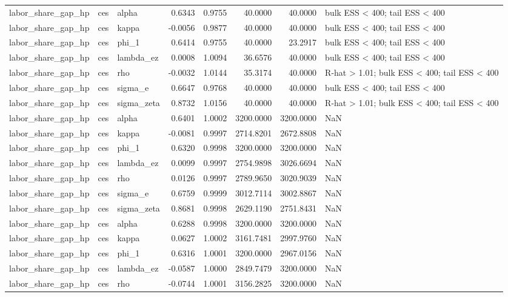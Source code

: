 \begin{tabular}{lllrrrrl}
labor\_share\_gap\_hp & ces & alpha & 0.6343 & 0.9755 & 40.0000 & 40.0000 & bulk ESS < 400; tail ESS < 400 \\
labor\_share\_gap\_hp & ces & kappa & -0.0056 & 0.9877 & 40.0000 & 40.0000 & bulk ESS < 400; tail ESS < 400 \\
labor\_share\_gap\_hp & ces & phi\_1 & 0.6414 & 0.9755 & 40.0000 & 23.2917 & bulk ESS < 400; tail ESS < 400 \\
labor\_share\_gap\_hp & ces & lambda\_ez & 0.0008 & 1.0094 & 36.6576 & 40.0000 & bulk ESS < 400; tail ESS < 400 \\
labor\_share\_gap\_hp & ces & rho & -0.0032 & 1.0144 & 35.3174 & 40.0000 & R-hat > 1.01; bulk ESS < 400; tail ESS < 400 \\
labor\_share\_gap\_hp & ces & sigma\_e & 0.6647 & 0.9768 & 40.0000 & 40.0000 & bulk ESS < 400; tail ESS < 400 \\
labor\_share\_gap\_hp & ces & sigma\_zeta & 0.8732 & 1.0156 & 40.0000 & 40.0000 & R-hat > 1.01; bulk ESS < 400; tail ESS < 400 \\
labor\_share\_gap\_hp & ces & alpha & 0.6401 & 1.0002 & 3200.0000 & 3200.0000 & NaN \\
labor\_share\_gap\_hp & ces & kappa & -0.0081 & 0.9997 & 2714.8201 & 2672.8808 & NaN \\
labor\_share\_gap\_hp & ces & phi\_1 & 0.6320 & 0.9998 & 3200.0000 & 3200.0000 & NaN \\
labor\_share\_gap\_hp & ces & lambda\_ez & 0.0099 & 0.9997 & 2754.9898 & 3026.6694 & NaN \\
labor\_share\_gap\_hp & ces & rho & 0.0126 & 0.9997 & 2789.9650 & 3020.9039 & NaN \\
labor\_share\_gap\_hp & ces & sigma\_e & 0.6759 & 0.9999 & 3012.7114 & 3002.8867 & NaN \\
labor\_share\_gap\_hp & ces & sigma\_zeta & 0.8681 & 0.9998 & 2629.1190 & 2751.8431 & NaN \\
labor\_share\_gap\_hp & ces & alpha & 0.6288 & 0.9998 & 3200.0000 & 3200.0000 & NaN \\
labor\_share\_gap\_hp & ces & kappa & 0.0627 & 1.0002 & 3161.7481 & 2997.9760 & NaN \\
labor\_share\_gap\_hp & ces & phi\_1 & 0.6316 & 1.0001 & 3200.0000 & 2967.0156 & NaN \\
labor\_share\_gap\_hp & ces & lambda\_ez & -0.0587 & 1.0000 & 2849.7479 & 3200.0000 & NaN \\
labor\_share\_gap\_hp & ces & rho & -0.0744 & 1.0001 & 3156.2825 & 3200.0000 & NaN \\

\end{tabular}
